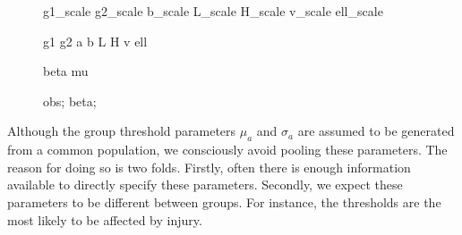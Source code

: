 \documentclass[a4paper,12pt]{article}
\begin{document}
\begin{figure}[H]
{        %
         {g1_scale}
         {g2_scale}
         {b_scale}
         {L_scale}
         {H_scale}
         {v_scale}
         {ell_scale}

         {g1}
         {g2}
         {a}
         {b}
         {L}
         {H}
         {v}
         {ell}

         {beta}
         {mu}

         {obs};
         {beta};
    }
\end{figure}

Although the group threshold parameters $\mu_a$ and $\sigma_a$ are assumed to be generated from a common population, we consciously avoid pooling these parameters. The reason for doing so is two folds. Firstly, often there is enough information available to directly specify these parameters. Secondly, we expect these parameters to be different between groups. For instance, the thresholds are the most likely to be affected by injury.
\end{document}
